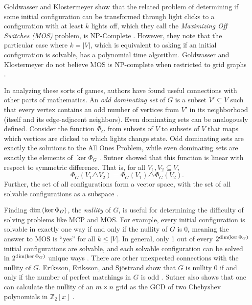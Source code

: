 \documentclass[a4paper]{article}
\newcommand{\Z}{\mathbb{Z}}
\newcommand{\abs}[1]{\left| #1 \right|}
\renewcommand{\dim}[1]{\textnormal{dim}\left( #1 \right)}
\begin{document}
	Goldwasser and Klostermeyer show that the related problem of determining if some initial configuration can be transformed through light clicks to a configuration with at least $k$ lights off, which they call the \textit{Maximizing Off Switches (MOS)} problem, is NP-Complete \cite{Goldwasser2000}.
	However, they note that the particular case where $k = \abs{V}$, which is equivalent to asking if an initial configuration is solvable, has a polynomial time algorithm.
	Goldwasser and Klostermeyer do not believe MOS is NP-complete when restricted to grid graphs \cite{Goldwasser2000}.
	
	In analyzing these sorts of games, authors have found useful connections with other parts of mathematics.
	An \textit{odd dominating set} of $G$ is a subset $V' \subseteq V$ such that every vertex contains an odd number of vertices from $V'$ in its neighborhood (itself and its edge-adjacent neighbors).
	Even dominating sets can be analogously defined.
	Consider the function $\Phi_G$ from subsets of $V$ to subsets of $V$ that maps which vertices are clicked to which lights change state.
	Odd dominating sets are exactly the solutions to the All Ones Problem, while even dominating sets are exactly the elements of $\ker{\Phi_G}$ \cite{Sutner1989}.
	Sutner showed that this function is linear with respect to symmetric difference.
	That is, for all $V_1, V_2 \subseteq V$,
	\begin{equation*}
		\Phi_G(V_1 \triangle V_2) = \Phi_G(V_1) \triangle \Phi_G(V_2).
	\end{equation*}
	Further, the set of all configurations form a vector space, with the set of all solvable configurations as a subspace \cite{Sutner1988}. 
	
	Finding $\dim{\ker{\Phi_G}}$, the \textit{nullity} of $G$, is useful for determining the difficulty of solving problems like MCP and MOS. 
	For example, every initial configuration is solvable in exactly one way if and only if the nullity of $G$ is 0, meaning the answer to MOS is ``yes'' for all $k \leq \abs{V}$.
	In general, only 1 out of every $2^{\dim{\ker{\Phi_G}}}$ initial configurations are solvable, and each solvable configuration can be solved in $2^{\dim{\ker{\Phi_G}}}$ unique ways \cite{Sutner1989}.
	There are other unexpected connections with the nullity of $G$.
	Eriksson, Eriksson, and Sjöstrand show that $G$ is nullity 0 if and only if the number of perfect matchings in $G$ is odd \cite{ERIKSSON2001357}.
	Sutner also shows that one can calculate the nullity of an $m \times n$ grid as the GCD of two Chebyshev polynomials in $\Z_2[x]$ \cite{Sutner2000}.
	
\end{document}
